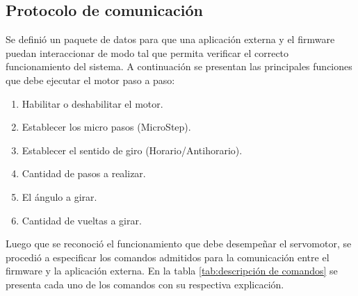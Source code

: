 \vspace{1cm}
\subsection{Protocolo de comunicación}
\label{subsec:Protocolo de comunicación}
Se definió un paquete de datos para que una aplicación externa y el firmware puedan interaccionar de modo tal que permita verificar el correcto funcionamiento del sistema. 
A continuación se presentan las principales funciones que debe ejecutar el motor paso a paso:

\begin{enumerate}
\item Habilitar o deshabilitar el motor.
\item Establecer los micro pasos (MicroStep).
\item Establecer el sentido de giro (Horario/Antihorario).
\item Cantidad de pasos a realizar.
\item El ángulo a girar.
\item Cantidad de vueltas a girar.
\end{enumerate}

Luego que se reconoció el funcionamiento que debe desempeñar el servomotor, se procedió a especificar los comandos admitidos para la comunicación entre el firmware y la aplicación externa. En la tabla \ref{tab:descripción de comandos} se presenta cada uno de los comandos con su respectiva explicación.  

